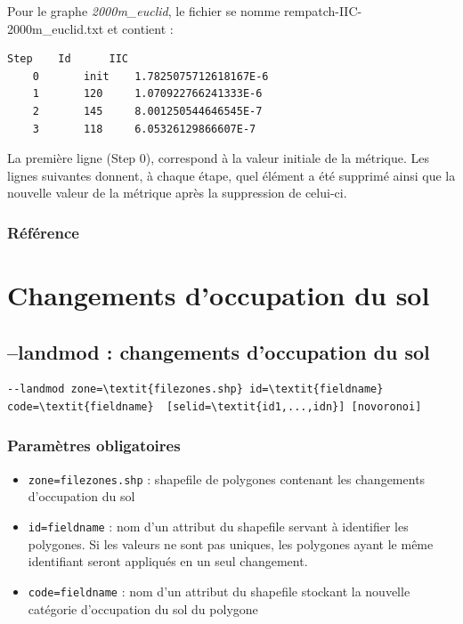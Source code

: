 \documentclass[a4paper,10pt]{report}
\begin{document}
Pour le graphe \textit{2000m\_euclid}, le fichier se nomme rempatch-IIC-2000m\_euclid.txt et contient :
\begin{Verbatim}[tabsize=4]
	Step	Id  	IIC
	0   	init	1.7825075712618167E-6
	1   	120 	1.070922766241333E-6
	2   	145 	8.001250544646545E-7
	3   	118 	6.05326129866607E-7
\end{Verbatim}
La première ligne (Step 0), correspond à la valeur initiale de la métrique. Les lignes suivantes donnent, à chaque étape, quel élément a été supprimé ainsi que la nouvelle valeur de la métrique après la suppression de celui-ci.

\subsubsection{Référence}
\cite{2016_campagnole}


\section{Changements d'occupation du sol}
\subsection{--landmod : changements d'occupation du sol}

\begin{Verbatim}[commandchars=\\\{\}]
--landmod zone=\textit{filezones.shp} id=\textit{fieldname} code=\textit{fieldname}  [selid=\textit{id1,...,idn}] [novoronoi]
\end{Verbatim}

\subsubsection{Paramètres obligatoires}
\begin{itemize}
	\item \verb|zone=filezones.shp| : shapefile de polygones contenant les changements d'occupation du sol
	\item \verb|id=fieldname| : nom d'un attribut du shapefile servant à identifier les polygones. Si les valeurs ne sont pas uniques, les polygones ayant le même identifiant seront appliqués en un seul changement.
	\item \verb|code=fieldname| : nom d'un attribut du shapefile stockant la nouvelle catégorie d'occupation du sol du polygone
\end{itemize}
\end{document}
